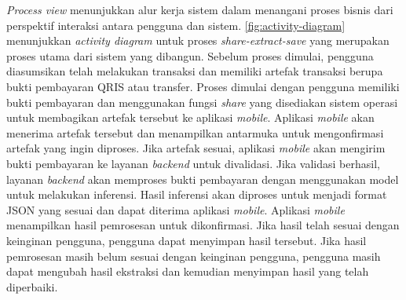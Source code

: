 \emph{Process view} menunjukkan alur kerja sistem dalam menangani proses bisnis dari perspektif interaksi antara pengguna dan sistem. \autoref{fig:activity-diagram} menunjukkan \emph{activity diagram} untuk proses \emph{share-extract-save} yang merupakan proses utama dari sistem yang dibangun. Sebelum proses dimulai, pengguna diasumsikan telah melakukan transaksi dan memiliki artefak transaksi berupa bukti pembayaran QRIS atau transfer. Proses dimulai dengan pengguna memiliki bukti pembayaran dan menggunakan fungsi \emph{share} yang disediakan sistem operasi untuk membagikan artefak tersebut ke aplikasi \emph{mobile}. Aplikasi \emph{mobile} akan menerima artefak tersebut dan menampilkan antarmuka untuk mengonfirmasi artefak yang ingin diproses. Jika artefak sesuai, aplikasi \emph{mobile} akan mengirim bukti pembayaran ke layanan \emph{backend} untuk divalidasi. Jika validasi berhasil, layanan \emph{backend} akan memproses bukti pembayaran dengan menggunakan model \donut{} untuk melakukan inferensi. Hasil inferensi akan diproses untuk menjadi format JSON yang sesuai dan dapat diterima aplikasi \emph{mobile}. Aplikasi \emph{mobile} menampilkan hasil pemrosesan untuk dikonfirmasi. Jika hasil telah sesuai dengan keinginan pengguna, pengguna dapat menyimpan hasil tersebut. Jika hasil pemrosesan masih belum sesuai dengan keinginan pengguna, pengguna masih dapat mengubah hasil ekstraksi dan kemudian menyimpan hasil yang telah diperbaiki.
